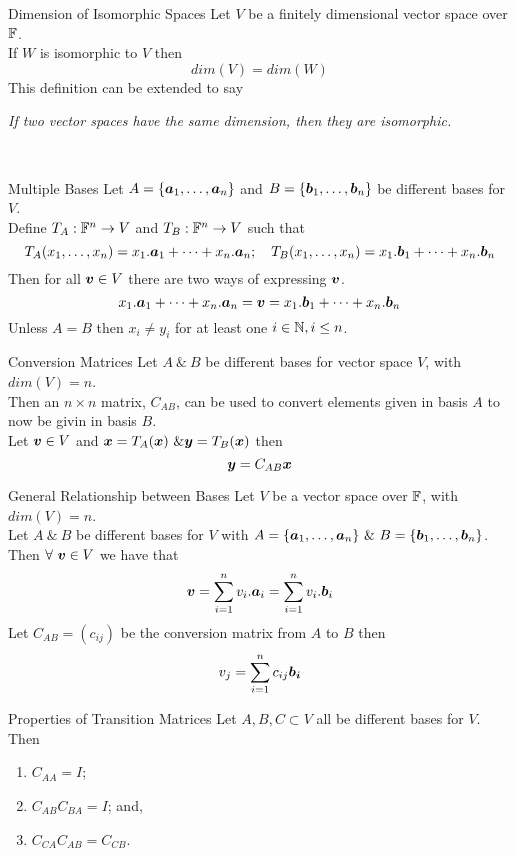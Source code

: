 \documentclass[11pt,a4paper]{article}
\begin{document}
\subtitle{Theorem 7.25 - }{Dimension of Isomorphic Spaces}
Let $V$ be a finitely dimensional vector space over $\mathbb{F}$.\\
If $W$ is isomorphic to $V$ then $$dim(V) = dim(W)$$
This definition can be extended to say\\
\centerline{\textit{If two vector spaces have the same dimension, then they are isomorphic.}}\\

\subtitle{Proposition 7.26 - }{Multiple Bases}
Let $A = \{\boldsymbol{a}_1 , \dots , \boldsymbol{a}_n\}$ and $B = \{\boldsymbol{b}_1 , \dots , \boldsymbol{b}_n\}$ be different bases for $V$.\\
Define $T_A : \mathbb{F}^n \to V$ and $T_B : \mathbb{F}^n \to V$ such that
$$T_A(x_1, \dots , x_n) = x_1.\boldsymbol{a}_1 + \dots + x_n.\boldsymbol{a}_n; \quad T_B(x_1, \dots , x_n) = x_1.\boldsymbol{b}_1 + \dots + x_n.\boldsymbol{b}_n$$
Then for all $\boldsymbol{v} \in V$ there are two ways of expressing $\boldsymbol{v}$.
$$x_1.\boldsymbol{a}_1 + \dots + x_n.\boldsymbol{a}_n = \boldsymbol{v} = x_1.\boldsymbol{b}_1 + \dots + x_n.\boldsymbol{b}_n$$
Unless $A = B$ then $x_i \not = y_i$ for at least one $i \in \mathbb{N}, i \leq n$.\\

\subtitle{Theorem 7.27 - }{Conversion Matrices}
Let $A\ \&\ B$ be different bases for vector space $V$, with $dim(V) = n$.\\
Then an $n \times n$ matrix, $C_{AB}$, can be used to convert elements given in basis $A$ to now be givin in basis $B$.\\
Let $\boldsymbol{v} \in V$ and $\boldsymbol{x} = T_{A}(\boldsymbol{x})\ \& \boldsymbol{y} = T_{B}(\boldsymbol{x})$ then $$\boldsymbol{y} = C_{AB}\boldsymbol{x}$$

\subtitle{Theorem 7.28 - }{General Relationship between Bases}
Let $V$ be a vector space over $\mathbb{F}$, with $dim(V) = n$.\\
Let $A\ \&\ B$ be different bases for $V$ with $A = \{\vect{a}_1 , \dots , \vect{a}_n\}\ \&\ B = \{\vect{b}_1 , \dots , \vect{b}_n\}$.\\
Then $\forall\ \boldsymbol{v} \in V$ we have that $$\boldsymbol{v} = \sum_{i=1}^{n} v_i . \boldsymbol{a}_i = \sum_{i=1}^{n} v_i . \boldsymbol{b}_i $$
Let $C_{AB} = (c_{ij})$ be the conversion matrix from $A$ to $B$ then $$v_j = \sum_{i=1}^{n} c_{ij}\boldsymbol{b_i}$$

\subtitle{Theorem 7.29 - }{Properties of Transition Matrices}
Let $A, B, C \subset V$ all be different bases for $V$. Then
\begin{enumerate}[label=\roman*)]
  \item $C_{AA} = I$;
  \item $C_{AB}C_{BA} = I$; and,
  \item $C_{CA}C_{AB} = C_{CB}$.\\
\end{enumerate}
\end{document}
